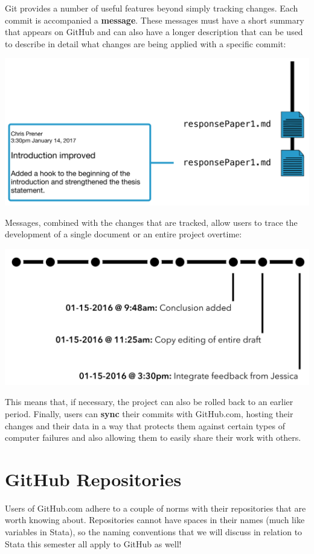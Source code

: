 \documentclass[]{book}
\begin{document}
Git provides a number of useful features beyond simply tracking changes.
Each commit is accompanied a \textbf{message}. These messages must have
a short summary that appears on GitHub and can also have a longer
description that can be used to describe in detail what changes are
being applied with a specific commit:

\includegraphics[width=1\linewidth]{images/gitFlow03}

Messages, combined with the changes that are tracked, allow users to
trace the development of a single document or an entire project
overtime:

\includegraphics[width=1\linewidth]{images/gitFlow04}

This means that, if necessary, the project can also be rolled back to an
earlier period. Finally, users can \textbf{sync} their commits with
GitHub.com, hosting their changes and their data in a way that protects
them against certain types of computer failures and also allowing them
to easily share their work with others.

\section{GitHub Repositories}\label{github-repositories}

Users of GitHub.com adhere to a couple of norms with their repositories
that are worth knowing about. Repositories cannot have spaces in their
names (much like variables in Stata), so the naming conventions that we
will discuss in relation to Stata this semester all apply to GitHub as
well!
\end{document}
